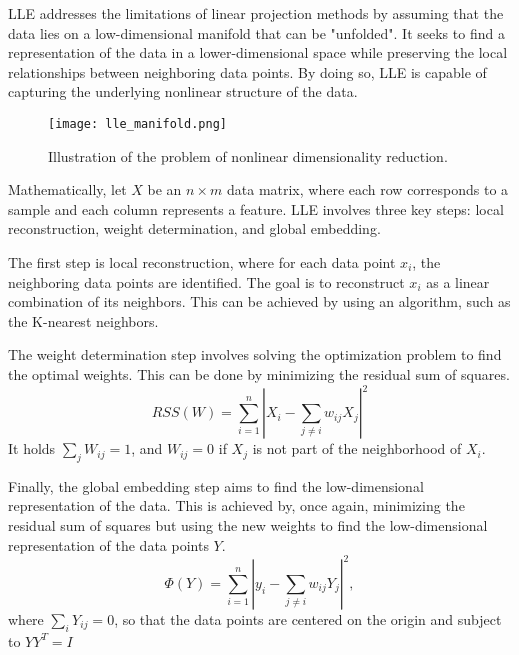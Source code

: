 LLE addresses the limitations of linear projection methods by assuming that the data lies on a low-dimensional manifold that can be "unfolded". It seeks to find a representation of the data in a lower-dimensional space while preserving the local relationships between neighboring data points. By doing so, LLE is capable of capturing the underlying nonlinear structure of the data.

\begin{figure}
  \centering
  \texttt{[image: lle\_manifold.png]}
  \caption{Illustration of the problem of nonlinear dimensionality reduction.}
  \label{fig:lle_manifold}
\end{figure}

Mathematically, let $X$ be an $n \times m$ data matrix, where each row corresponds to a sample and each column represents a feature. LLE involves three key steps: local reconstruction, weight determination, and global embedding.

The first step is local reconstruction, where for each data point $x_i$, the neighboring data points are identified. The goal is to reconstruct $x_i$ as a linear combination of its neighbors. This can be achieved by using an algorithm, such as the K-nearest neighbors.

The weight determination step involves solving the optimization problem to find the optimal weights. This can be done by minimizing the residual sum of squares.
\begin{equation}
  RSS(W) = \sum^n_{i=1} |X_i - \sum_{j \neq i} w_{ij} X_j|^2
\end{equation}
It holds $\sum_j W_{ij} = 1$, and $W_{ij} = 0$ if $X_j$ is not part of the neighborhood of $X_i$.

Finally, the global embedding step aims to find the low-dimensional representation of the data. This is achieved by, once again, minimizing the residual sum of squares but using the new weights to find the low-dimensional representation of the data points $Y$.
\begin{equation}
  \Phi(Y) = \sum^n_{i=1} |y_i - \sum_{j\neq i}w_{ij}Y_j|^2,
\end{equation}
where $\sum_i Y_{ij} = 0$, so that the data points are centered on the origin and subject to $Y Y^T = I$

